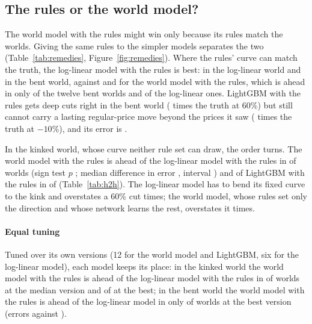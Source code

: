 

\subsection{The rules or the world model?}

The world model with the rules might win only because its rules match the worlds. Giving the same rules to the
simpler models separates the two (Table~\ref{tab:remedies}, Figure~\ref{fig:remedies}). Where the rules' curve can
match the truth, the log-linear model with the rules is best: \errLLlShape{} in the log-linear world and
\errBLlShape{} in the bent world, against \errLShape{} and \errBShape{} for the world model with the rules, which is ahead in
only \shapeBeatsLlB{} of the twelve bent worlds and \shapeBeatsLlL{} of the log-linear ones. LightGBM with the rules gets deep cuts right in the bent world (\cutsixBLgbShape{} times the truth
at 60\%) but still cannot carry a lasting regular-price move beyond the prices it saw (\regdownBLgbShape{} times the
truth at $-10\%$), and its error is \errBLgbShape{}.

In the kinked world, whose curve neither rule set can draw, the order turns. The world model with the rules is
ahead of the log-linear model with the rules in \hhBaseKWmLlWon{} of \hhBaseKWmLlN{} worlds (sign test $p$
\hhBaseKWmLlP{}; median difference in error \hhBaseKWmLlDiff{}, interval \hhBaseKWmLlCi{}) and of LightGBM with the
rules in \hhBaseKWmLgbWon{} of \hhBaseKWmLgbN{} (Table~\ref{tab:h2h}). The log-linear model has to bend its fixed
curve to the kink and overstates a 60\% cut \cutsixKLlShape{} times; the world model, whose rules set only the
direction and whose network learns the rest, overstates it \cutsixKShape{} times.

\paragraph{Equal tuning} Tuned over its own versions (12 for the world model and LightGBM, six for the log-linear
model), each model keeps its place: in the kinked world the world model with the rules is ahead of the log-linear
model with the rules in \hhMedKWmLlWon{} of \hhMedKWmLlN{} worlds at the median version and \hhBestKWmLlWon{} of
\hhBestKWmLlN{} at the best; in the bent world the world model with the rules is ahead of the log-linear model in only
\hhBestBWmLlWon{} of \hhBestBWmLlN{} worlds at the best version (errors \hhBestBWmLlA{} against \hhBestBWmLlB{}).

